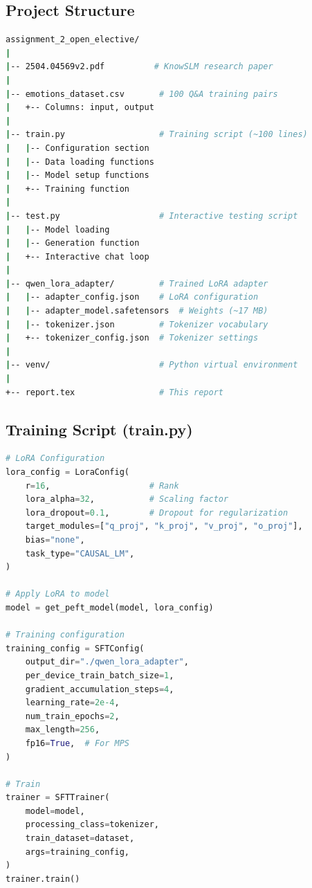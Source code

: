 \documentclass[12pt,a4paper]{article}
\begin{document}
\subsection{Project Structure}

\begin{lstlisting}[language=bash, caption=Project Directory Structure]
assignment_2_open_elective/
|
|-- 2504.04569v2.pdf          # KnowSLM research paper
|
|-- emotions_dataset.csv       # 100 Q&A training pairs
|   +-- Columns: input, output
|
|-- train.py                   # Training script (~100 lines)
|   |-- Configuration section
|   |-- Data loading functions
|   |-- Model setup functions
|   +-- Training function
|
|-- test.py                    # Interactive testing script
|   |-- Model loading
|   |-- Generation function
|   +-- Interactive chat loop
|
|-- qwen_lora_adapter/         # Trained LoRA adapter
|   |-- adapter_config.json    # LoRA configuration
|   |-- adapter_model.safetensors  # Weights (~17 MB)
|   |-- tokenizer.json         # Tokenizer vocabulary
|   +-- tokenizer_config.json  # Tokenizer settings
|
|-- venv/                      # Python virtual environment
|
+-- report.tex                 # This report
\end{lstlisting}

\subsection{Training Script (train.py)}

\begin{lstlisting}[language=Python, caption=Key Training Code Snippets]
# LoRA Configuration
lora_config = LoraConfig(
    r=16,                    # Rank
    lora_alpha=32,           # Scaling factor
    lora_dropout=0.1,        # Dropout for regularization
    target_modules=["q_proj", "k_proj", "v_proj", "o_proj"],
    bias="none",
    task_type="CAUSAL_LM",
)

# Apply LoRA to model
model = get_peft_model(model, lora_config)

# Training configuration
training_config = SFTConfig(
    output_dir="./qwen_lora_adapter",
    per_device_train_batch_size=1,
    gradient_accumulation_steps=4,
    learning_rate=2e-4,
    num_train_epochs=2,
    max_length=256,
    fp16=True,  # For MPS
)

# Train
trainer = SFTTrainer(
    model=model,
    processing_class=tokenizer,
    train_dataset=dataset,
    args=training_config,
)
trainer.train()
\end{lstlisting}
\end{document}
